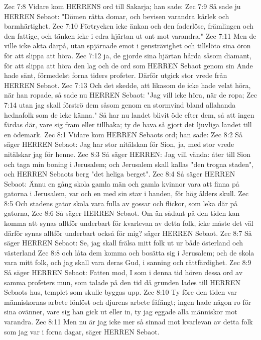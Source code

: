 Zec 7:8  Vidare kom HERRENS ord till Sakarja; han sade:
Zec 7:9  Så sade ju HERREN Sebaot: "Dömen rätta domar, och bevisen varandra kärlek och barmhärtighet.
Zec 7:10  Förtrycken icke änkan och den faderlöse, främlingen och den fattige, och tänken icke i edra hjärtan ut ont mot varandra."
Zec 7:11  Men de ville icke akta därpå, utan spjärnade emot i gensträvighet och tillslöto sina öron för att slippa att höra.
Zec 7:12  ja, de gjorde sina hjärtan hårda såsom diamant, för att slippa att höra den lag och de ord som HERREN Sebaot genom sin Ande hade sänt, förmedelst forna tiders profeter. Därför utgick stor vrede från HERREN Sebaot.
Zec 7:13  Och det skedde, att likasom de icke hade velat höra, när han ropade, så sade nu HERREN Sebaot: "Jag vill icke höra, när de ropa;
Zec 7:14  utan jag skall förströ dem såsom genom en stormvind bland allahanda hednafolk som de icke känna." Så har nu landet blivit öde efter dem, så att ingen färdas där, vare sig fram eller tillbaka; ty de hava så gjort det ljuvliga landet till en ödemark.
Zec 8:1  Vidare kom HERREN Sebaots ord; han sade:
Zec 8:2  Så säger HERREN Sebaot: Jag har stor nitälskan för Sion, ja, med stor vrede nitälskar jag för henne.
Zec 8:3  Så säger HERREN: Jag vill vända: åter till Sion och taga min boning i Jerusalem; och Jerusalem skall kallas "den trogna staden", och HERREN Sebaots berg "det heliga berget".
Zec 8:4  Så säger HERREN Sebaot: Ännu en gång skola gamla män och gamla kvinnor vara att finna på gatorna i Jerusalem, var och en med sin stav i handen, för hög ålders skull.
Zec 8:5  Och stadens gator skola vara fulla av gossar och flickor, som leka där på gatorna,
Zec 8:6  Så säger HERREN Sebaot. Om än sådant på den tiden kan komma att synas alltför underbart för kvarlevan av detta folk, icke måste det väl därför synas alltför underbart också för mig? säger HERREN Sebaot.
Zec 8:7  Så säger HERREN Sebaot: Se, jag skall frälsa mitt folk ut ur både österland och västerland
Zec 8:8  och låta dem komma och bosätta sig i Jerusalem; och de skola vara mitt folk, och jag skall vara deras Gud, i sanning och rättfärdighet.
Zec 8:9  Så säger HERREN Sebaot: Fatten mod, I som i denna tid hören dessa ord av samma profeters mun, som talade på den tid då grunden lades till HERREN Sebaots hus, templet som skulle byggas upp.
Zec 8:10  Ty före den tiden var människornas arbete lönlöst och djurens arbete fåfängt; ingen hade någon ro för sina ovänner, vare sig han gick ut eller in, ty jag eggade alla människor mot varandra.
Zec 8:11  Men nu är jag icke mer så sinnad mot kvarlevan av detta folk som jag var i forna dagar, säger HERREN Sebaot.

